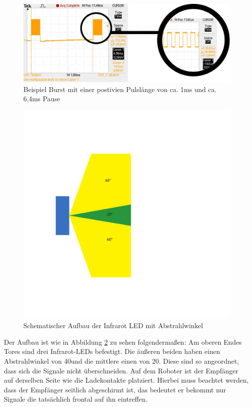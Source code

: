 \begin{figure}[!h]
	\includegraphics[width=\textwidth]{images/ir_burst_with_zoom.pdf}
	\caption{Beispiel Burst mit einer postivien Pulslänge von ca. 1ms und ca. 6,4ms Pause}
	\label{fig:ir_burst}
\end{figure}

\begin{figure}[!h]
	\centering
	\includegraphics[width=\textwidth]{images/ir_led_aufbau.pdf}
	\caption{Schematischer Aufbau der Infrarot LED mit Abstrahlwinkel}
	\label{fig:ir_led_aufbau}
\end{figure}

Der Aufbau ist wie in Abbildung \ref{fig:ir_led_aufbau} zu sehen folgendermaßen:
Am oberen Endes Tores sind drei Infrarot-LEDs befestigt. Die äußeren beiden haben einen Abstrahlwinkel von 40\degree  und die mittlere einen von 20\degree. Diese sind so angeordnet, dass sich die Signale nicht überschneiden. Auf dem Roboter ist der Empfänger auf derselben Seite wie die Ladekontakte platziert. Hierbei muss beachtet werden, dass der Empfänger seitlich abgeschirmt ist, das bedeutet er bekommt nur Signale die tatsächlich frontal auf ihn eintreffen.


